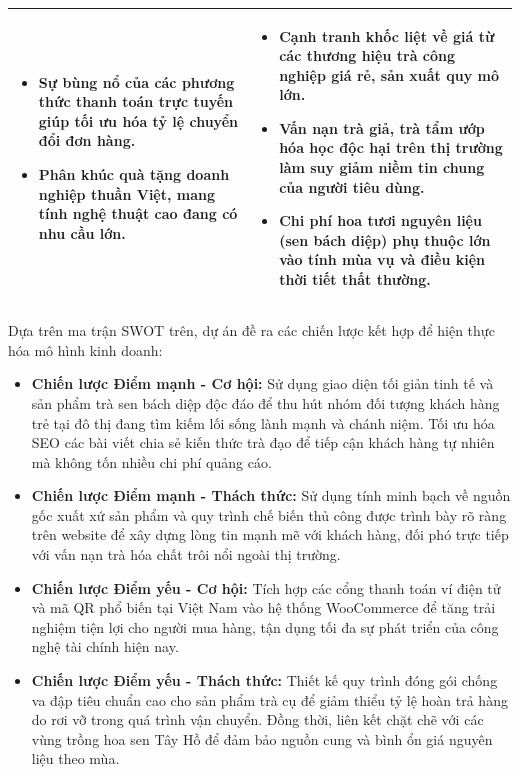 \begin{longtable}{p{7.5cm}p{7.5cm}}
\begin{itemize}
    \item Sự bùng nổ của các phương thức thanh toán trực tuyến giúp tối ưu hóa tỷ lệ chuyển đổi đơn hàng.
    \item Phân khúc quà tặng doanh nghiệp thuần Việt, mang tính nghệ thuật cao đang có nhu cầu lớn.
\end{itemize} & 
\begin{itemize}
    \item Cạnh tranh khốc liệt về giá từ các thương hiệu trà công nghiệp giá rẻ, sản xuất quy mô lớn.
    \item Vấn nạn trà giả, trà tẩm ướp hóa học độc hại trên thị trường làm suy giảm niềm tin chung của người tiêu dùng.
    \item Chi phí hoa tươi nguyên liệu (sen bách diệp) phụ thuộc lớn vào tính mùa vụ và điều kiện thời tiết thất thường.
\end{itemize} \\ \bottomrule
\end{longtable}

Dựa trên ma trận SWOT trên, dự án đề ra các chiến lược kết hợp để hiện thực hóa mô hình kinh doanh:
\begin{itemize}
    \item \textbf{Chiến lược Điểm mạnh - Cơ hội:} Sử dụng giao diện tối giản tinh tế và sản phẩm trà sen bách diệp độc đáo để thu hút nhóm đối tượng khách hàng trẻ tại đô thị đang tìm kiếm lối sống lành mạnh và chánh niệm. Tối ưu hóa SEO các bài viết chia sẻ kiến thức trà đạo để tiếp cận khách hàng tự nhiên mà không tốn nhiều chi phí quảng cáo.
    \item \textbf{Chiến lược Điểm mạnh - Thách thức:} Sử dụng tính minh bạch về nguồn gốc xuất xứ sản phẩm và quy trình chế biến thủ công được trình bày rõ ràng trên website để xây dựng lòng tin mạnh mẽ với khách hàng, đối phó trực tiếp với vấn nạn trà hóa chất trôi nổi ngoài thị trường.
    \item \textbf{Chiến lược Điểm yếu - Cơ hội:} Tích hợp các cổng thanh toán ví điện tử và mã QR phổ biến tại Việt Nam vào hệ thống WooCommerce để tăng trải nghiệm tiện lợi cho người mua hàng, tận dụng tối đa sự phát triển của công nghệ tài chính hiện nay.
    \item \textbf{Chiến lược Điểm yếu - Thách thức:} Thiết kế quy trình đóng gói chống va đập tiêu chuẩn cao cho sản phẩm trà cụ để giảm thiểu tỷ lệ hoàn trả hàng do rơi vỡ trong quá trình vận chuyển. Đồng thời, liên kết chặt chẽ với các vùng trồng hoa sen Tây Hồ để đảm bảo nguồn cung và bình ổn giá nguyên liệu theo mùa.
\end{itemize}

